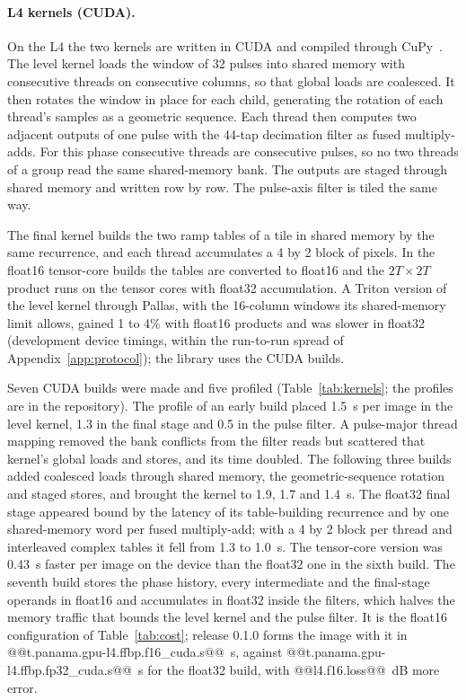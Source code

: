 \documentclass[11pt]{article}
\begin{document}
\paragraph{L4 kernels (CUDA).} On the L4 the two kernels are written in CUDA and compiled through CuPy~\cite{okuta2017}. The level kernel loads the window of 32 pulses into shared memory with consecutive threads on consecutive columns, so that global loads are coalesced. It then rotates the window in place for each child, generating the rotation of each thread's samples as a geometric sequence. Each thread then computes two adjacent outputs of one pulse with the 44-tap decimation filter as fused multiply-adds. For this phase consecutive threads are consecutive pulses, so no two threads of a group read the same shared-memory bank. The outputs are staged through shared memory and written row by row. The pulse-axis filter is tiled the same way.

The final kernel builds the two ramp tables of a tile in shared memory by the same recurrence, and each thread accumulates a 4 by 2 block of pixels. In the float16 tensor-core builds the tables are converted to float16 and the $2T \times 2T$ product runs on the tensor cores with float32 accumulation. A Triton version of the level kernel through Pallas, with the 16-column windows its shared-memory limit allows, gained 1 to 4\% with float16 products and was slower in float32 (development device timings, within the run-to-run spread of Appendix~\ref{app:protocol}); the library uses the CUDA builds.

Seven CUDA builds were made and five profiled (Table~\ref{tab:kernels}; the profiles are in the repository). The profile of an early build placed 1.5~s per image in the level kernel, 1.3 in the final stage and 0.5 in the pulse filter. A pulse-major thread mapping removed the bank conflicts from the filter reads but scattered that kernel's global loads and stores, and its time doubled. The following three builds added coalesced loads through shared memory, the geometric-sequence rotation and staged stores, and brought the kernel to 1.9, 1.7 and 1.4~s. The float32 final stage appeared bound by the latency of its table-building recurrence and by one shared-memory word per fused multiply-add; with a 4 by 2 block per thread and interleaved complex tables it fell from 1.3 to 1.0~s. The tensor-core version was 0.43~s faster per image on the device than the float32 one in the sixth build. The seventh build stores the phase history, every intermediate and the final-stage operands in float16 and accumulates in float32 inside the filters, which halves the memory traffic that bounds the level kernel and the pulse filter. It is the float16 configuration of Table~\ref{tab:cost}; release 0.1.0 forms the image with it in @@t.panama.gpu-l4.ffbp.f16_cuda.s@@~s, against @@t.panama.gpu-l4.ffbp.fp32_cuda.s@@~s for the float32 build, with @@l4.f16.loss@@~dB more error.
\end{document}
